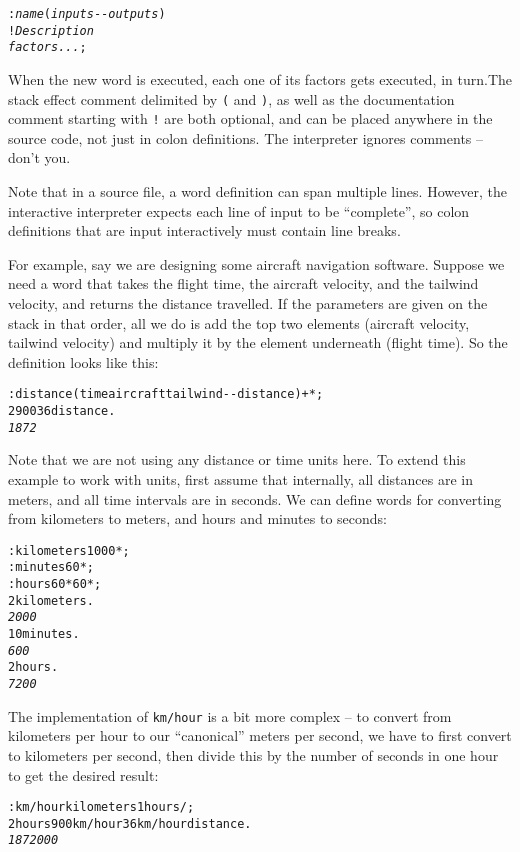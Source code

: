 \documentclass[english]{article}
\begin{document}
\begin{alltt}
: \emph{name} ( \emph{inputs} -{}- \emph{outputs} )
    ! \emph{Description}
    \emph{factors ...} ;
\end{alltt}

When the new word is executed, each one of its factors gets executed,
in turn.The stack effect comment delimited by \texttt{(} and \texttt{)},
as well as the documentation comment starting with \texttt{!} are
both optional, and can be placed anywhere in the source code, not
just in colon definitions. The interpreter ignores comments -- don't you.

Note that in a source file, a word definition can span multiple lines.
However, the interactive interpreter expects each line of input to
be ``complete'', so colon definitions that are input interactively must contain line breaks.

For example, say we are designing some aircraft
navigation software. Suppose we need a word that takes the flight time, the aircraft
velocity, and the tailwind velocity, and returns the distance travelled.
If the parameters are given on the stack in that order, all we do
is add the top two elements (aircraft velocity, tailwind velocity)
and multiply it by the element underneath (flight time). So the definition
looks like this:

\begin{alltt}
: distance ( time aircraft tailwind -{}- distance ) + {*} ;
2 900 36 distance .
\emph{1872}
\end{alltt}

Note that we are not using any distance or time units here. To extend this example to work with units, first assume that internally, all distances are
in meters, and all time intervals are in seconds. We can define words
for converting from kilometers to meters, and hours and minutes to
seconds:

\begin{alltt}
: kilometers 1000 {*} ;
: minutes 60 {*} ;
: hours 60 {*} 60 {*} ;
2 kilometers .
\emph{2000}
10 minutes .
\emph{600}
2 hours .
\emph{7200}
\end{alltt}

The implementation of \texttt{km/hour} is a bit more complex -- to convert from kilometers per hour to our ``canonical'' meters per second, we have to first convert to kilometers per second, then divide this by the number of seconds in one hour to get the desired result:

\begin{alltt}
: km/hour kilometers 1 hours / ;
2 hours 900 km/hour 36 km/hour distance .
\emph{1872000}
\end{alltt}
\end{document}
